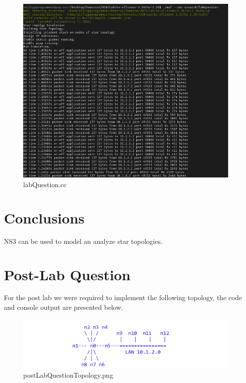 \documentclass[fullpage]{article}
\begin{document}
\begin{figure}[H]
  \includegraphics[width=\linewidth]{labQuestion.png}
  \caption{labQuestion.cc}
  \label{fig:output2}
\end{figure}

\section{Conclusions}
NS3 can be used to model an analyze star topologies.

\section{Post-Lab Question}
For the post lab we were required to implement the following topology, the code
and console output are presented below.

\begin{figure}[H]
  \includegraphics[width=\linewidth]{postLabQuestionTopology.png}
  \caption{postLabQuestionTopology.png}
  \label{fig:output3}
\end{figure}
\end{document}
